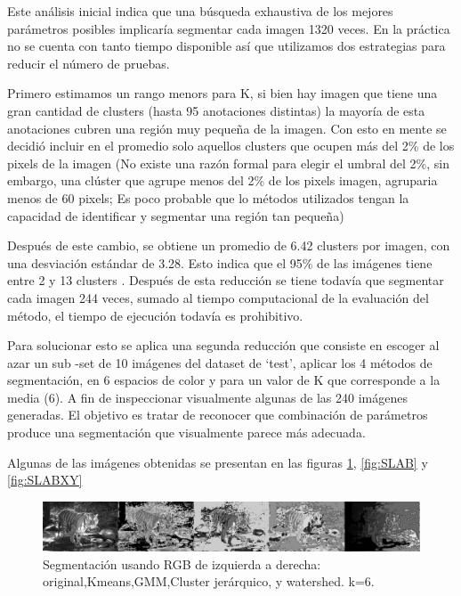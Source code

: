 \documentclass[10pt,twocolumn,letterpaper]{article}
\begin{document}
Este análisis inicial indica que una búsqueda exhaustiva de los mejores parámetros posibles implicaría segmentar cada imagen  1320 veces.  En la práctica no se cuenta con tanto tiempo disponible así que utilizamos dos estrategias para reducir el número de pruebas.

Primero estimamos un rango menors para K, si bien hay imagen que tiene una gran cantidad de clusters (hasta 95 anotaciones distintas) la mayoría de esta anotaciones cubren una región muy pequeña de la imagen. Con esto en mente se decidió incluir en el promedio solo aquellos clusters que ocupen más del 2\% de los pixels de la imagen (No existe una razón formal para elegir el umbral del 2\%, sin embargo, una clúster que agrupe menos del 2\% de los pixels imagen, agruparia menos de 60 pixels; Es poco probable que lo métodos utilizados tengan la capacidad de identificar y segmentar una región tan pequeña)

Después de este cambio, se obtiene un promedio de 6.42 clusters por imagen, con una desviación estándar de 3.28. Esto indica que el 95\% de las imágenes tiene entre 2 y  13 clusters . Después de esta reducción se tiene todavía que segmentar cada imagen 244 veces, sumado al tiempo computacional de la evaluación del método, el tiempo de ejecución todavía es prohibitivo.

Para solucionar esto se aplica una segunda reducción que consiste en escoger al azar un sub -set de 10 imágenes del dataset de ‘test’, aplicar los 4 métodos de segmentación, en 6 espacios de color y para un valor de K que corresponde a  la media (6). A fin de inspeccionar visualmente algunas de las 240 imágenes generadas. El objetivo es tratar de reconocer que combinación de parámetros produce una segmentación que visualmente parece más adecuada.

Algunas de las imágenes obtenidas se presentan en las figuras \ref{fig:sRGB}, \ref{fig:SLAB} y \ref{fig:SLABXY}


\begin{figure}
\begin{center}
\includegraphics[width=0.95\linewidth]
                  {img/RGSample.jpg}
\end{center}
  \caption{Segmentación usando RGB de izquierda a derecha: original,Kmeans,GMM,Cluster jerárquico, y watershed. k=6.}
\label{fig:sRGB}
\end{figure}
\end{document}
